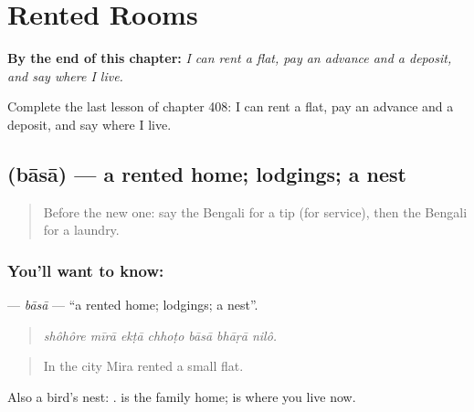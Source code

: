 
\chapter{Rented Rooms}
\label{ch:bn-rented-rooms}

\begin{chapteropening}
\textbf{By the end of this chapter:} \emph{I can rent a flat, pay an advance and a deposit, and say where I live.}

Complete the last lesson of chapter 408: I can rent a flat, pay an advance and a deposit, and say where I live.
\end{chapteropening}

\section[\texorpdfstring{\bn{বাসা} (bāsā)}{বাসা (bāsā)}]{ (bāsā) — a rented home; lodgings; a nest}

\label{lesson:BN-C408-basa}



\begin{quote}
Before the new one: say the Bengali for a tip (for service), then the Bengali for a laundry.
\end{quote}

\subsection*{You'll want to know: }
\textbf{} — \emph{bāsā} — \textquotedblleft{}a rented home; lodgings; a nest\textquotedblright{}.

\begin{quote}
      
\end{quote}

\begin{quote}
\emph{shôhôre mīrā ekṭā chhoṭo bāsā bhāṛā nilô.}
\end{quote}

\begin{quote}
In the city Mira rented a small flat.
\end{quote}

Also a bird's nest:  .  is the family home;  is where you live now.

